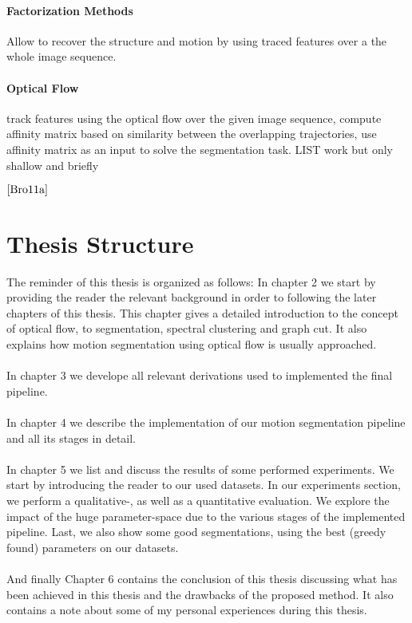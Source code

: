 \paragraph{Factorization Methods} Allow to recover the structure and motion by using traced features over a the whole image sequence.

\paragraph{Optical Flow}
track features using the optical flow over the given image sequence, compute affinity matrix based on similarity between the overlapping trajectories, use affinity matrix as an input to solve the segmentation task. LIST work but only shallow and briefly

$\cite{Bro11a}$

\section{Thesis Structure}

The reminder of this thesis is organized as follows:
In chapter 2 we start by providing the reader the relevant background in order to following the later chapters of this thesis. This chapter gives a detailed introduction to the concept of optical flow, to segmentation, spectral clustering and graph cut. It also explains how motion segmentation using optical flow is usually approached. \\ \\
In chapter 3 we develope all relevant derivations used to implemented the final pipeline. \\ \\
In chapter 4 we describe the implementation of our motion segmentation pipeline and all its stages in detail. \\ \\
In chapter 5 we list and discuss the results of some performed experiments. We start by introducing the reader to our used datasets. In our experiments section, we perform a qualitative-, as well as a quantitative evaluation. We explore the impact of the huge parameter-space due to the various stages of the implemented pipeline. Last, we also show some good segmentations, using the best (greedy found) parameters on our datasets. \\ \\
And finally Chapter 6 contains the conclusion of this thesis discussing what has been achieved in this thesis and the drawbacks of the proposed method. It also contains a note about some of my personal experiences during this thesis. 